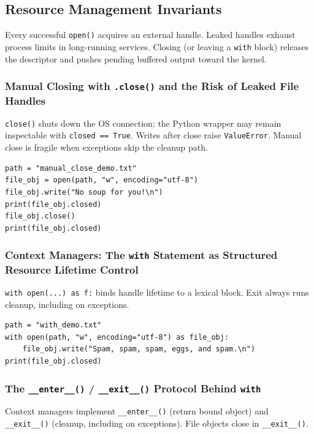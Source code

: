 \subsection{Resource Management Invariants}

Every successful \texttt{open()} acquires an external handle. Leaked handles exhaust process limits in long-running services. Closing (or leaving a \texttt{with} block) releases the descriptor and pushes pending buffered output toward the kernel.

\subsubsection{Manual Closing with \texttt{.close()} and the Risk of Leaked File Handles}

\texttt{close()} shuts down the OS connection; the Python wrapper may remain inspectable with \texttt{closed == True}. Writes after close raise \texttt{ValueError}. Manual close is fragile when exceptions skip the cleanup path.

\begin{verbatim}
path = "manual_close_demo.txt"
file_obj = open(path, "w", encoding="utf-8")
file_obj.write("No soup for you!\n")
print(file_obj.closed)
file_obj.close()
print(file_obj.closed)
\end{verbatim}

\subsubsection{Context Managers: The \texttt{with} Statement as Structured Resource Lifetime Control}

\texttt{with open(...) as f:} binds handle lifetime to a lexical block. Exit always runs cleanup, including on exceptions.

\begin{verbatim}
path = "with_demo.txt"
with open(path, "w", encoding="utf-8") as file_obj:
    file_obj.write("Spam, spam, spam, eggs, and spam.\n")
print(file_obj.closed)
\end{verbatim}

\subsubsection{The \texttt{\_\_enter\_\_()} / \texttt{\_\_exit\_\_()} Protocol Behind \texttt{with}}

Context managers implement \texttt{\_\_enter\_\_()} (return bound object) and \texttt{\_\_exit\_\_()} (cleanup, including on exceptions). File objects close in \texttt{\_\_exit\_\_()}.

